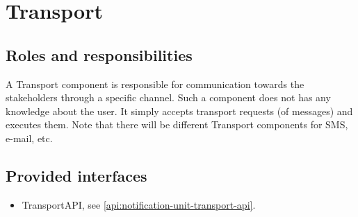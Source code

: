 \section{Transport}
\label{element:transport}

\subsection{Roles and responsibilities}

\npar A Transport component is responsible for communication towards the
stakeholders through a specific channel. Such a component does not has any
knowledge about the user. It simply accepts transport requests (of messages) and
executes them. Note that there will be different Transport components for SMS,
e-mail, etc.

\subsection{Provided interfaces}

\begin{itemize}
  \item TransportAPI, see \ref{api:notification-unit-transport-api}.
\end{itemize}